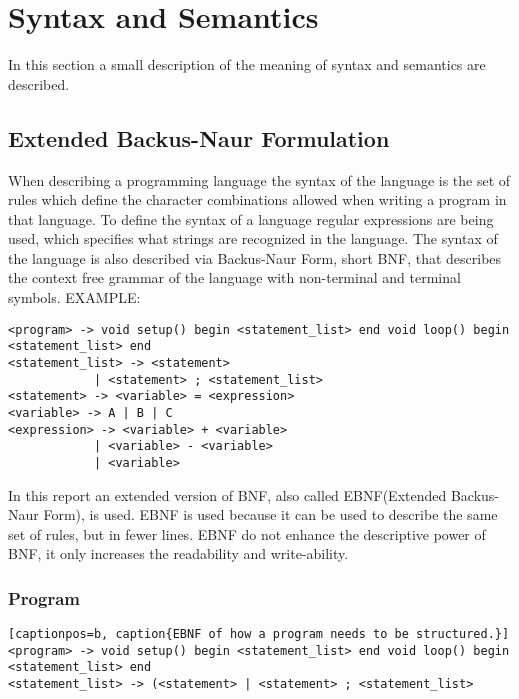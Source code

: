 \chapter{Syntax and Semantics}\label{analysis:syntax-and-semantics}
In this section a small description of the meaning of syntax and semantics are described.

\section{Extended Backus-Naur Formulation}
When describing a programming language the syntax of the language is the set of rules which define the character combinations allowed when writing a program in that language. To define the syntax of a language regular expressions are being used, which specifies what strings are recognized in the language. The syntax of the language is also described via Backus-Naur Form, short BNF, that describes the context free grammar of the language with non-terminal and terminal symbols.
EXAMPLE: \\
\begin{lstlisting}
<program> -> void setup() begin <statement_list> end void loop() begin <statement_list> end
<statement_list> -> <statement>
			| <statement> ; <statement_list>
<statement> -> <variable> = <expression>
<variable> -> A | B | C
<expression> -> <variable> + <variable>
			| <variable> - <variable>
			| <variable>
\end{lstlisting}

In this report an extended version of BNF, also called EBNF(Extended Backus-Naur Form), is used. EBNF is used because it can be used to describe the same set of rules, but in fewer lines. EBNF do not enhance the descriptive power of BNF, it only increases the readability and write-ability.

\subsection{Program}
\begin{lstlisting}[captionpos=b, caption{EBNF of how a program needs to be structured.}]
<program> -> void setup() begin <statement_list> end void loop() begin <statement_list> end
<statement_list> -> (<statement> | <statement> ; <statement_list>
\end{lstlisting}

